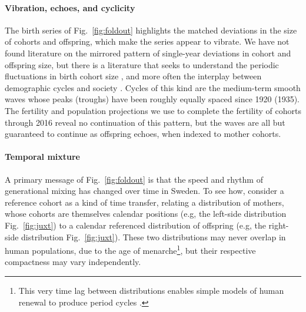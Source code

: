 \documentclass{article}
\begin{document}
\paragraph{Vibration, echoes, and cyclicity}
The birth series of Fig.~\ref{fig:foldout} highlights the matched deviations in the size of cohorts and offspring, which make the series appear to vibrate. We have not found literature on the mirrored pattern of single-year deviations in cohort and offspring size, but there is a literature that seeks to understand the periodic fluctuations in birth cohort size \citep[This literature largely derives from][]{lee1974formal}, and more often the interplay between demographic cycles and society \citep[e.g.,][]{easterlin1987birth}. Cycles of this kind are the medium-term smooth waves whose peaks (troughs) have been roughly equally spaced since 1920 (1935). The fertility and population projections we use to complete the fertility of cohorts through 2016 reveal no continuation of this pattern, but the waves are all but guaranteed to continue as offspring echoes, when indexed to mother cohorts.

\paragraph{Temporal mixture}
A primary message of Fig.~\ref{fig:foldout} is that the speed and rhythm of generational mixing has changed over time in Sweden. To see how, consider a reference cohort as a kind of time transfer, relating a distribution of mothers, whose cohorts are themselves calendar positions (e.g, the left-side distribution Fig.~\ref{fig:juxt}) to a calendar referenced distribution of offspring (e.g, the right-side distribution Fig.~\ref{fig:juxt}). These two distributions may never overlap in human populations, due to the age of menarche\footnote{This very time lag between distributions enables simple models of human renewal to produce period cycles \citep{wachter1991pre}.}, but their respective compactness may vary independently. 
\end{document}
